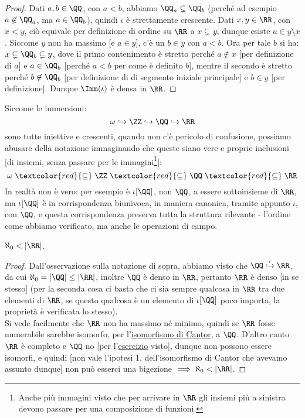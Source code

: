 \documentclass[11pt]{scrartcl}
\begin{document}
\begin{proof}
	Dati $a,b \in \QQ$, con $a < b$, abbiamo $\QQ_a \subsetneq \QQ_b$ (perché ad esempio $a \not \in \QQ_a$, ma $a \in \QQ_b$), quindi $\iota$ è strettamente crescente. Dati $x,y \in \RR$, con $x < y$, ciò equivale 
	per definizione di ordine su $\RR$ a $x \subsetneq y$, dunque esiste $a \in y \setminus x$. Siccome $y$ non ha massimo [e $a \in y$], c'è un $b \in y$ con $a < b$. Ora per tale $b$ si ha: $x \subsetneq \QQ_b \subsetneq y$,
	dove il primo contenimento è stretto perché $a \not \in x$ [per definizione di $a$] e $a \in \QQ_b$ [perché $a<b$ per come è definito $b$], mentre 
	il secondo è stretto perché $b \not \in \QQ_b$ [per definizione di di segmento iniziale principale] e $b \in y$ [per definizione]. Dunque $\Imm(\iota)$ è densa in $\RR$.
\end{proof}

\begin{notation}
	Siccome le immersioni:
	\[ \omega \hookrightarrow \ZZ \hookrightarrow \QQ \hookrightarrow \RR
		\]
	sono tutte iniettive e crescenti, quando non c'è pericolo di confusione, possiamo abusare della notazione immaginando che 
	queste siano vere e proprie inclusioni [di insiemi, senza passare per le immagini\footnote{Anche più immagini visto che per
	arrivare in $\RR$ gli insiemi più a sinistra devono passare per una composizione di funzioni.}]:
	\[ \omega \;\textcolor{red}{\subseteq}\; \ZZ \;\textcolor{red}{\subseteq} \;\QQ \;\textcolor{red}{\subseteq}\; \RR
		\]
	In realtà non è vero: per esempio è $\iota[\QQ]$, non $\QQ$, a essere sottoinsieme di $\RR$, ma $\iota[\QQ]$ è in corrispondenza biunivoca, in maniera 
	canonica, tramite appunto $\iota$, con $\QQ$, e questa corrispondenza preserva tutta la struttura rilevante - l'ordine come abbiamo verificato, ma anche le 
	operazioni di campo.
\end{notation}

\begin{corollary}
	$\aleph_0 < |\RR|$.
\end{corollary}

\begin{proof}
	Dall'osservazione sulla notazione di sopra, abbiamo visto che $\QQ \overset{\iota}{\hookrightarrow} \RR$, da cui $\aleph_0 = |\QQ| \leq |\RR|$, inoltre $\QQ$ è denso in $\RR$, pertanto 
	$\RR$ è denso [in se stesso] (per la seconda cosa ci basta che ci sia sempre qualcosa in $\RR$ tra due elementi di $\RR$, se questo qualcosa è un elemento di $\iota[\QQ]$ poco importa,
	la proprietà è verificata lo stesso).\\ Si vede facilmente che $\RR$ non ha massimo né minimo, quindi se $\RR$ fosse numerabile sarebbe isomorfo, per l'\hyperref[isoCantor]{isomorfismo di Cantor},
	a $\QQ$. D'altro canto $\RR$ è completo e $\QQ$ no [per l'\hyperref[q_noncompleto]{esercizio} visto], dunque non possono essere isomorfi, e quindi [non vale l'ipotesi 1. dell'isomorfismo di Cantor che avevamo assunto dunque] non può esserci una bigezione $\implies \aleph_0 < |\RR|$.
\end{proof}
\end{document}
